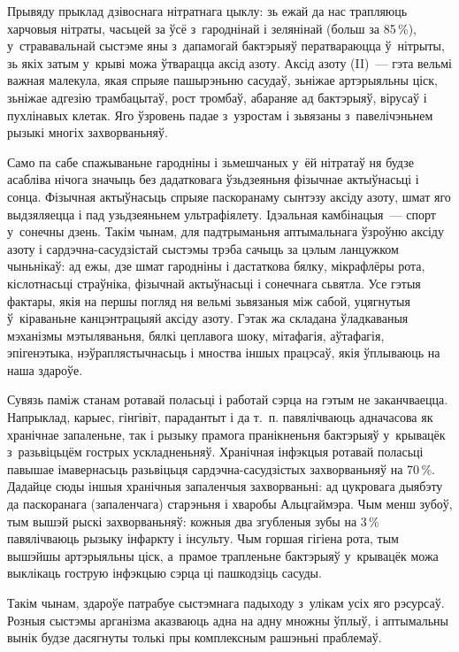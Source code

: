 Прывяду прыклад дзівоснага нітратнага цыклу: зь ежай да нас трапляюць харчовыя нітраты, часьцей за ўсё з~гароднінай і зелянінай (больш за 85\,\%), у~стрававальнай сыстэме яны з~дапамогай бактэрыяў ператвараюцца ў~нітрыты, зь якіх затым у~крыві можа ўтварацца аксід азоту. Аксід азоту (II)~--- гэта вельмі важная малекула, якая спрыяе пашырэньню сасудаў, зьніжае артэрыяльны ціск, зьніжае адгезію трамбацытаў, рост тромбаў, абараняе ад бактэрыяў, вірусаў і пухлінавых клетак. Яго ўзровень падае з~узростам і зьвязаны з~павелічэньнем рызыкі многіх захворваньняў.

Само па сабе спажываньне гародніны і зьмешчаных у~ёй нітратаў ня будзе асабліва нічога значыць без дадатковага ўзьдзеяньня фізычнае актыўнасьці і сонца. Фізычная актыўнасьць спрыяе паскоранаму сынтэзу аксіду азоту, шмат яго выдзяляецца і пад узьдзеяньнем ультрафіялету. Ідэальная камбінацыя~--- спорт у~сонечны дзень. Такім чынам, для падтрыманьня аптымальнага ўзроўню аксіду азоту і сардэчна-сасудзістай сыстэмы трэба сачыць за цэлым ланцужком чыньнікаў: ад ежы, дзе шмат гародніны і дастаткова бялку, мікрафлёры рота, кіслотнасьці страўніка, фізычнай актыўнасьці і сонечнага сьвятла. Усе гэтыя фактары, якія на першы погляд ня вельмі зьвязаныя між сабой, уцягнутыя ў~кіраваньне канцэнтрацыяй аксіду азоту. Гэтак жа складана ўладкаваныя мэханізмы мэтыляваньня, бялкі цеплавога шоку, мітафагія, аўтафагія, эпігенэтыка, нэўраплястычнасьць і мноства іншых працэсаў, якія ўплываюць на наша здароўе.

Сувязь паміж станам ротавай поласьці і работай сэрца на гэтым не заканчваецца. Напрыклад, карыес, гінгівіт, парадантыт і да т.~п. павялічваюць адначасова як хранічнае запаленьне, так і рызыку прамога пранікненьня бактэрыяў у~крывацёк з~разьвіцьцём гострых ускладненьняў. Хранічная інфэкцыя ротавай поласьці павышае імавернасьць разьвіцьця сардэчна-сасудзістых захворваньняў на 70\,\%. Дадайце сюды іншыя хранічныя запаленчыя захворваньні: ад цукровага дыябэту да паскоранага (запаленчага) старэньня і хваробы Альцгаймэра. Чым менш зубоў, тым вышэй рыскі захворваньняў: кожныя два згубленыя зубы на 3\,\% павялічваюць рызыку інфаркту і інсульту. Чым горшая гігіена рота, тым вышэйшы артэрыяльны ціск, а~прамое трапленьне бактэрыяў у~крывацёк можа выклікаць гострую інфэкцыю сэрца ці пашкодзіць сасуды.

Такім чынам, здароўе патрабуе сыстэмнага падыходу з~улікам усіх яго рэсурсаў. Розныя сыстэмы арганізма аказваюць адна на адну множны ўплыў, і аптымальны вынік будзе дасягнуты толькі пры комплексным рашэньні праблемаў.

